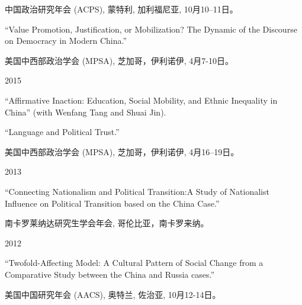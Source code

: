 \documentclass[10.5pt,]{article}
\providecommand{\tightlist}{%
	\setlength{\itemsep}{0pt}\setlength{\parskip}{0pt}}
\renewenvironment{itemize}{
	\begin{list}{}{
			\setlength{\leftmargin}{1.5em}
		}
	}{
	\end{list}
}
\begin{document}
\begin{itemize}
\begin{itemize}
    \begin{itemize}
    \tightlist
    \item
      \footnotesize 中国政治研究年会 (ACPS), 蒙特利, 加利福尼亚,
      10月10--11日。
    \end{itemize}
  \item
    ``Value Promotion, Justification, or Mobilization? The Dynamic of
    the Discourse on Democracy in Modern China.''

    \begin{itemize}
    \tightlist
    \item
      \footnotesize 美国中西部政治学会 (MPSA), 芝加哥，伊利诺伊,
      4月7-10日。
    \end{itemize}
  \end{itemize}
\item
  2015

  \begin{itemize}
  \tightlist
  \item
    ``Affirmative Inaction: Education, Social Mobility, and Ethnic
    Inequality in China'' (with Wenfang Tang and Shuai Jin).
  \item
    ``Language and Political Trust.''

    \begin{itemize}
    \tightlist
    \item
      \footnotesize 美国中西部政治学会 (MPSA), 芝加哥，伊利诺伊,
      4月16--19日。
    \end{itemize}
  \end{itemize}
\item
  2013

  \begin{itemize}
  \tightlist
  \item
    ``Connecting Nationalism and Political Transition:A Study of
    Nationalist Influence on Political Transition based on the China
    Case.''

    \begin{itemize}
    \tightlist
    \item
      \footnotesize 南卡罗莱纳达研究生学会年会, 哥伦比亚，南卡罗来纳。
    \end{itemize}
  \end{itemize}
\item
  2012

  \begin{itemize}
  \tightlist
  \item
    ``Twofold-Affecting Model: A Cultural Pattern of Social Change from
    a Comparative Study between the China and Russia cases.''

    \begin{itemize}
    \tightlist
    \item
      \footnotesize 美国中国研究年会 (AACS), 奥特兰, 佐治亚,
      10月12-14日。
    \end{itemize}
  \end{itemize}
\end{itemize}
\end{document}
